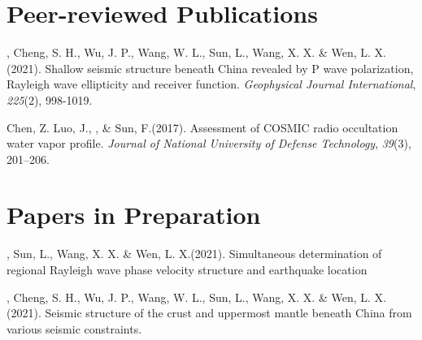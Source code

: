 \newcommand{\Revision}{\textit{under revision}}
\newcommand{\CS}{*} %
\newcommand{\CF}{\textsuperscript{\#}} %


\section*{Peer-reviewed Publications}

\begin{etaremune}
\item
    \Xiao, Cheng, S. H., Wu, J. P., Wang, W. L., Sun, L., Wang, X. X. \& Wen, L. X.(2021).
    Shallow seismic structure beneath China revealed by P wave polarization, Rayleigh wave ellipticity and receiver function.
    \textit{Geophysical Journal International}, \textit{225}(2), 998-1019.
\item
    Chen, Z. Luo, J.,  \Xiao, \& Sun, F.(2017).
    Assessment of COSMIC radio occultation water vapor profile.
    \textit{Journal of National University of Defense Technology}, \textit{39}(3), 201--206.
\end{etaremune}


\section*{Papers in Preparation}
\begin{etaremune}
\item
    \Xiao, Sun, L., Wang, X. X. \& Wen, L. X.(2021).
    Simultaneous determination of regional Rayleigh wave phase velocity structure and earthquake location
\item
    \Xiao, Cheng, S. H., Wu, J. P., Wang, W. L., Sun, L., Wang, X. X. \& Wen, L. X.(2021).
    Seismic structure of the crust and uppermost mantle beneath China from various seismic constraints.
\end{etaremune}

